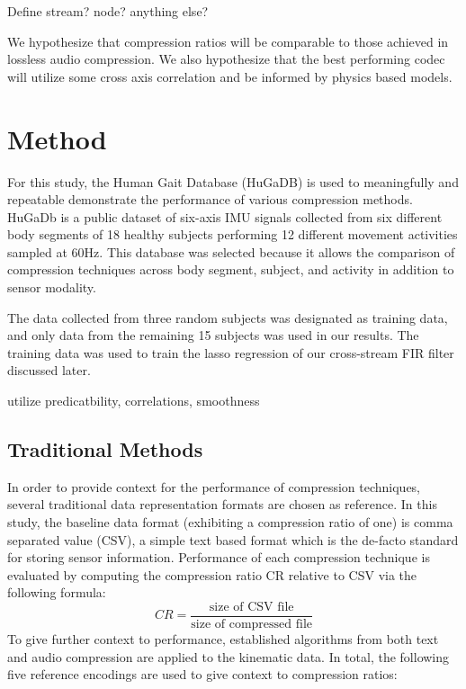 \documentclass[journal]{IEEEtran}
\begin{document}
Define stream? node? anything else?

We hypothesize that compression ratios will be comparable to those achieved in lossless audio compression. We also hypothesize that the best performing codec will utilize some cross axis correlation and be informed by physics based models.

\section{Method}
For this study, the Human Gait Database (HuGaDB)\cite{Chereshnev2018} is used to meaningfully and repeatable demonstrate the performance of various compression methods. HuGaDb is a public dataset of six-axis IMU signals collected from six different body segments of 18 healthy subjects performing 12 different movement activities sampled at 60Hz. This database was selected because it allows the comparison of compression techniques across body segment, subject, and activity in addition to sensor modality.

The data collected from three random subjects was designated as training data, and only data from the remaining 15 subjects was used in our results. The training data was used to train the lasso regression of our cross-stream FIR filter discussed later.

utilize predicatbility, correlations, smoothness

\subsection{Traditional Methods}
In order to provide context for the performance of compression techniques, several traditional data representation formats are chosen as reference. In this study, the baseline data format (exhibiting a compression ratio of one) is comma separated value (CSV), a simple text based format which is the de-facto standard for storing sensor information. Performance of each compression technique is evaluated by computing the compression ratio CR relative to CSV via the following formula:
$$CR = \frac{\textrm{size of CSV file}}{\textrm{size of compressed file}}$$
To give further context to performance, established algorithms from both text and audio compression are applied to the kinematic data. In total, the following five reference encodings are used to give context to compression ratios:
\end{document}
